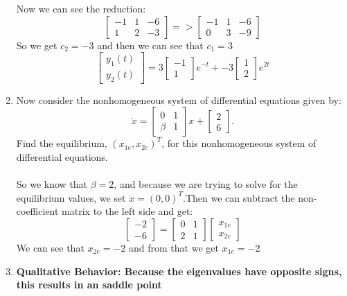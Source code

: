 \documentclass[12pt]{article}
\begin{document}
\begin{enumerate}[label = (\alph*)]
$$			$$
		Now we can see the reduction:
			$$
			\begin{bmatrix}
				-1 & 1 & -6 \\
				1 & 2 & -3
			\end{bmatrix}
			=>
			\begin{bmatrix}
				-1 & 1 & -6 \\
				0 & 3 & -9	
			\end{bmatrix}
			$$
		So we get \boldmath $c_2 = -3$ and then we can see that $c_1 = 3$
			$$
			\begin{bmatrix}
			y_1(t) \\ y_2(t)
			\end{bmatrix}
			= 
			3
			\begin{bmatrix}
			-1 \\ 1
			\end{bmatrix}e^{-t} + 
			-3
			\begin{bmatrix}
			1 \\ 2
			\end{bmatrix}e^{2t}
			$$
			\unboldmath 
		\newpage
		\item Now consider the nonhomogeneous system of differential equations given by:
			$$
			\dot{x}
			=
			\left\lbrack
			\begin{array}{rr}
			0 & 1 \\
			\beta & 1
			\end{array}
			\right\rbrack x +
			\left\lbrack  
			\begin{array}{r}
			2 \\
			6 
			\end{array}
			\right\rbrack .
			$$
		Find the equilibrium, $(x_{1e}, x_{2e})^T$, for this nonhomogeneous system of differential equations.
		\\ \\
		So we know that $\beta = 2$, and because we are trying to solve for the equilibrium values, we set $\dot{x} = (0,0)^T$.Then we can subtract the non-coefficient matrix to the left side and get:	
			$$
			\begin{bmatrix}
				-2 \\ -6
			\end{bmatrix}
			= 
			\begin{bmatrix}
				0 & 1 \\
				2 & 1
			\end{bmatrix}
			\begin{bmatrix}
				x_{1e} \\ x_{2e}
			\end{bmatrix}
			$$
		We can see that \boldmath $x_{2e} = -2$ and from that we get $x_{1e} = -2$\unboldmath
		\\ 
		\item \textbf{Qualitative Behavior: Because the eigenvalues have opposite signs, this results in an saddle point} 
	\end{enumerate}
\end{document}
